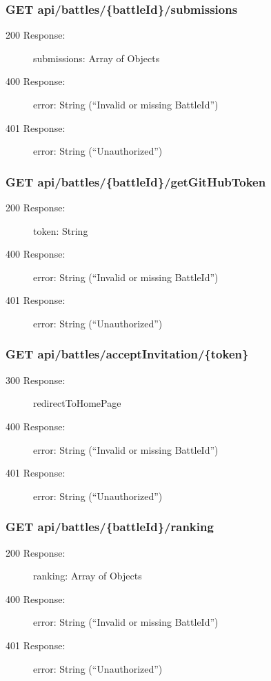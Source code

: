 \documentclass{Configuration_Files/Template}
\begin{document}
\subsubsection{GET api/battles/\{battleId\}/submissions}
\begin{description}
    \item[200 Response:] submissions: Array of Objects
    \item[400 Response:] error: String (“Invalid or missing BattleId”)
    \item[401 Response:] error: String (“Unauthorized”)
\end{description}

\subsubsection{GET api/battles/\{battleId\}/getGitHubToken}
\begin{description}
    \item[200 Response:] token: String
    \item[400 Response:] error: String (“Invalid or missing BattleId”)
    \item[401 Response:] error: String (“Unauthorized”)
\end{description}

\subsubsection{GET api/battles/acceptInvitation/\{token\}}
\begin{description}
    \item[300 Response:] redirectToHomePage
    \item[400 Response:] error: String (“Invalid or missing BattleId”)
    \item[401 Response:] error: String (“Unauthorized”)
\end{description}

\subsubsection{GET api/battles/\{battleId\}/ranking}
\begin{description}
    \item[200 Response:] ranking: Array of Objects
    \item[400 Response:] error: String (“Invalid or missing BattleId”)
    \item[401 Response:] error: String (“Unauthorized”)
\end{description}
\end{document}

